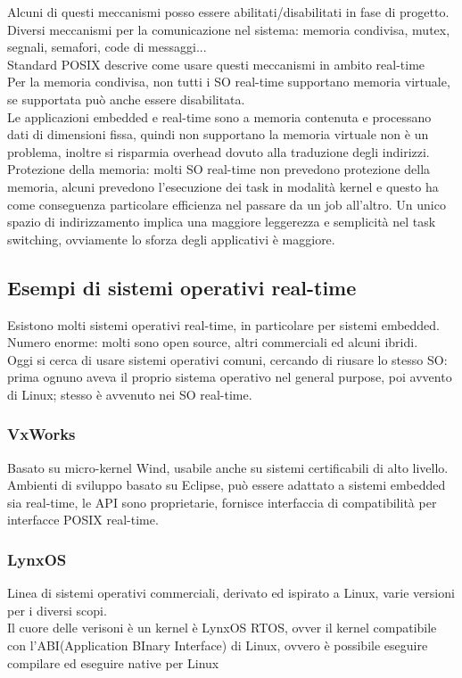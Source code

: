\documentclass[12pt, oneside]{extbook}
\begin{document}
Alcuni di questi meccanismi posso essere abilitati/disabilitati in fase di progetto.\\ Diversi meccanismi per la comunicazione nel sistema: memoria condivisa, mutex, segnali, semafori, code di messaggi...\\ Standard POSIX descrive come usare questi meccanismi in ambito real-time\\ Per la memoria condivisa, non tutti i SO real-time supportano memoria virtuale, se supportata può anche essere disabilitata.\\ Le applicazioni embedded e real-time sono a memoria contenuta e processano dati di dimensioni fissa, quindi non supportano la memoria virtuale non è un problema, inoltre si risparmia overhead dovuto alla traduzione degli indirizzi.\\ Protezione della memoria: molti SO real-time non prevedono protezione della memoria, alcuni prevedono l'esecuzione dei task in modalità kernel e questo ha come conseguenza particolare efficienza nel passare da un job all'altro. Un unico spazio di indirizzamento implica una maggiore leggerezza e semplicità nel task switching, ovviamente lo sforza degli applicativi è maggiore.
\subsection{Esempi di sistemi  operativi real-time}
Esistono molti sistemi operativi real-time, in particolare per sistemi embedded. Numero enorme: molti sono open source, altri commerciali ed alcuni ibridi.\\ Oggi si cerca di usare sistemi operativi comuni, cercando di riusare lo stesso SO: prima ognuno aveva il proprio sistema operativo nel general purpose, poi avvento di Linux; stesso è avvenuto nei SO real-time.
\subsubsection{VxWorks}
Basato su micro-kernel Wind, usabile anche su sistemi certificabili di alto livello. Ambienti di sviluppo basato su Eclipse, può essere adattato a sistemi embedded sia real-time, le API sono proprietarie, fornisce interfaccia di compatibilità per interfacce POSIX real-time.
\subsubsection{LynxOS}
Linea di sistemi operativi commerciali, derivato ed ispirato a Linux, varie versioni per i diversi scopi.\\ Il cuore delle verisoni è un kernel è LynxOS RTOS, ovver il kernel compatibile con l'ABI(Application BInary Interface) di Linux, ovvero è possibile eseguire compilare ed eseguire native per Linux
\end{document}
